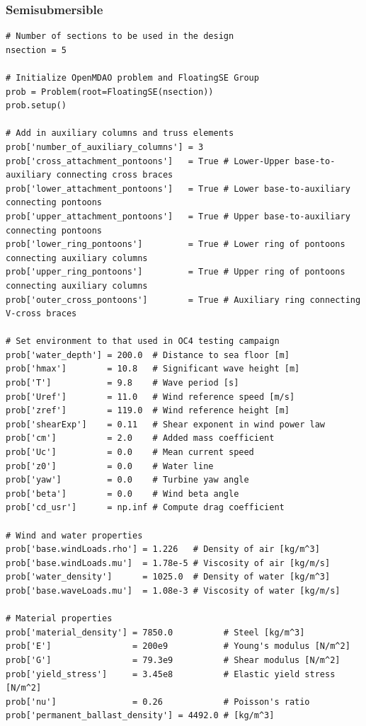 \subsubsection{Semisubmersible}
\begin{lstlisting}
# Number of sections to be used in the design
nsection = 5

# Initialize OpenMDAO problem and FloatingSE Group
prob = Problem(root=FloatingSE(nsection))
prob.setup()

# Add in auxiliary columns and truss elements
prob['number_of_auxiliary_columns'] = 3
prob['cross_attachment_pontoons']   = True # Lower-Upper base-to-auxiliary connecting cross braces
prob['lower_attachment_pontoons']   = True # Lower base-to-auxiliary connecting pontoons
prob['upper_attachment_pontoons']   = True # Upper base-to-auxiliary connecting pontoons
prob['lower_ring_pontoons']         = True # Lower ring of pontoons connecting auxiliary columns
prob['upper_ring_pontoons']         = True # Upper ring of pontoons connecting auxiliary columns
prob['outer_cross_pontoons']        = True # Auxiliary ring connecting V-cross braces

# Set environment to that used in OC4 testing campaign
prob['water_depth'] = 200.0  # Distance to sea floor [m]
prob['hmax']        = 10.8   # Significant wave height [m]
prob['T']           = 9.8    # Wave period [s]
prob['Uref']        = 11.0   # Wind reference speed [m/s]
prob['zref']        = 119.0  # Wind reference height [m]
prob['shearExp']    = 0.11   # Shear exponent in wind power law
prob['cm']          = 2.0    # Added mass coefficient
prob['Uc']          = 0.0    # Mean current speed
prob['z0']          = 0.0    # Water line
prob['yaw']         = 0.0    # Turbine yaw angle
prob['beta']        = 0.0    # Wind beta angle
prob['cd_usr']      = np.inf # Compute drag coefficient

# Wind and water properties
prob['base.windLoads.rho'] = 1.226   # Density of air [kg/m^3]
prob['base.windLoads.mu']  = 1.78e-5 # Viscosity of air [kg/m/s]
prob['water_density']      = 1025.0  # Density of water [kg/m^3]
prob['base.waveLoads.mu']  = 1.08e-3 # Viscosity of water [kg/m/s]

# Material properties
prob['material_density'] = 7850.0          # Steel [kg/m^3]
prob['E']                = 200e9           # Young's modulus [N/m^2]
prob['G']                = 79.3e9          # Shear modulus [N/m^2]
prob['yield_stress']     = 3.45e8          # Elastic yield stress [N/m^2]
prob['nu']               = 0.26            # Poisson's ratio
prob['permanent_ballast_density'] = 4492.0 # [kg/m^3]


\end{lstlisting}
